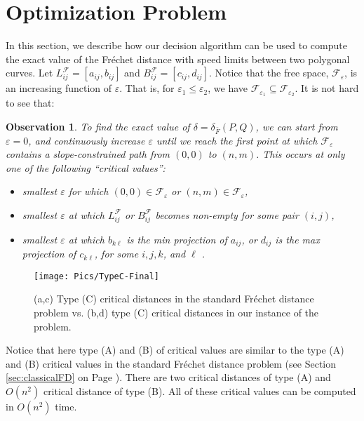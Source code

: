 \documentclass[12pt]{dalthesis}
\newtheorem{obs}{Observation}
\newcommand{\lee}{\leqslant}
\newcommand{\eps}{\varepsilon}
\newcommand{\CF}{{\mathscr F}}
\newcommand{\Frechet}{Fr\'echet }
\newcommand{\distFS}{\delta_{\bar{F}}} \newcommand{\distWeakF}{\delta_{\bar{N}}} \newcommand{\distClosedF}{\delta_{\bar{C}}} \newcommand{\distPartialF}{\delta_{\bar{P}}} \newcommand{\distGrpahF}{\delta_{\bar{G}}} \newcommand{\distDisF}{\delta_{dF}} \newcommand{\distGeoF}{\delta_{\hat{F}}} \newcommand{\distHomF}{\delta_{h}} \newcommand{\distC}{\delta_C} \newcommand{\distSetF}{\delta_{\CF}}
\newcommand{\SC}{slope-constrained }
\newcommand{\Feps}{\CF_\eps}
\newcommand{\LF}{L^\CF}
\newcommand{\BF}{B^\CF}
\begin{document}
\section{Optimization Problem} \label{sec:optimization}


In this section, we describe how our decision algorithm can be used to 
compute the exact value of the \Frechet distance with speed limits between two polygonal curves. 
Let $\LF_{ij} = [a_{ij}, b_{ij}]$ and  $\BF_{ij} = [c_{ij}, d_{ij}]$.
Notice that the free space, $\Feps$, is an increasing function of $\eps$.
That is, for $\eps_1 \lee \eps_2$, we have $\CF_{\eps_1} \subseteq \CF_{\eps_2}$.
It is not hard to see that:

\begin{obs}
\label{obs:criticaltypes}
To find the exact value of $\delta = \distFS(P,Q)$,
we can start from $\eps = 0$, and continuously increase $\eps$ until
we reach the first point at which $\Feps$ contains a \SC path from $(0,0)$ to $(n,m)$.
This occurs at only one of the following ``critical values'':
\begin{itemize}
	\item[(A)] smallest $\eps$ for which $(0,0) \in \Feps$ or $(n,m) \in \Feps$,
	\item[(B)] smallest $\eps$ at which $\LF_{ij}$ or $\BF_{ij}$  becomes non-empty for some pair $(i,j)$,
	\item[(C)] smallest $\eps$ at which $b_{k\ell}$ is the min projection of $a_{ij}$, or 
		$d_{ij}$ is the max projection of $c_{k\ell}$, for some $i,j,k$, and $\ell$ .
\end{itemize}

\end{obs}


\begin{figure}[t]
	\centering
	\texttt{[image: Pics/TypeC-Final]}  
	\caption{(a,c) Type (C) critical distances in the standard \Frechet distance problem vs. 
	(b,d) type (C) critical distances in our instance of the problem.}
	\label{fig:typeCCC}
\end{figure}

Notice that here
type (A) and (B) of critical values are similar to 
the type (A) and (B) critical values in the standard \Frechet 
distance problem
(see Section \ref{sec:classicalFD} on Page \pageref{alg:StandardFDec}).
There are two critical distances of type (A) and 
$O(n^2)$ critical distance of type (B). All of these critical values 
can be computed in  $O(n^2)$  time.
\end{document}
